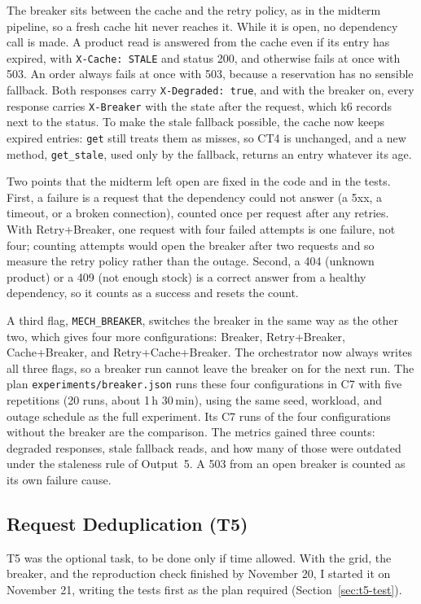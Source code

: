 \documentclass[10pt]{article}
\begin{document}
The breaker sits between the cache and the retry policy, as in the midterm
pipeline, so a fresh cache hit never reaches it. While it is open, no
dependency call is made. A product read is answered from the cache even if its
entry has expired, with \texttt{X-Cache: STALE} and status 200, and otherwise
fails at once with 503. An order always fails at once with 503, because a
reservation has no sensible fallback. Both responses carry
\texttt{X-Degraded: true}, and with the breaker on, every response carries
\texttt{X-Breaker} with the state after the request, which k6 records next to
the status. To make the stale fallback possible, the cache now keeps expired
entries: \texttt{get} still treats them as misses, so CT4 is unchanged, and a
new method, \texttt{get\_stale}, used only by the fallback, returns an entry
whatever its age.

Two points that the midterm left open are fixed in the code and in the tests.
First, a failure is a request that the dependency could not answer (a 5xx, a
timeout, or a broken connection), counted once per request after any retries.
With Retry+Breaker, one request with four failed attempts is one failure, not
four; counting attempts would open the breaker after two requests and so
measure the retry policy rather than the outage. Second, a 404 (unknown
product) or a 409 (not enough stock) is a correct answer from a healthy
dependency, so it counts as a success and resets the count.

A third flag, \texttt{MECH\_BREAKER}, switches the breaker in the same way as
the other two, which gives four more configurations: Breaker, Retry+Breaker,
Cache+Breaker, and Retry+Cache+Breaker. The orchestrator now always writes all
three flags, so a breaker run cannot leave the breaker on for the next run.
The plan \texttt{experiments/breaker.json} runs these four configurations in
C7 with five repetitions (20 runs, about 1\,h 30\,min), using the same seed,
workload, and outage schedule as the full experiment. Its C7 runs of the four
configurations without the breaker are the comparison. The metrics gained
three counts: degraded responses, stale fallback reads, and how many of those
were outdated under the staleness rule of Output~5. A 503 from an open breaker
is counted as its own failure cause.

\subsection{Request Deduplication (T5)}\label{sec:t5}
T5 was the optional task, to be done only if time allowed. With the grid, the
breaker, and the reproduction check finished by November 20, I started it on
November 21, writing the tests first as the plan required
(Section~\ref{sec:t5-test}).
\end{document}
